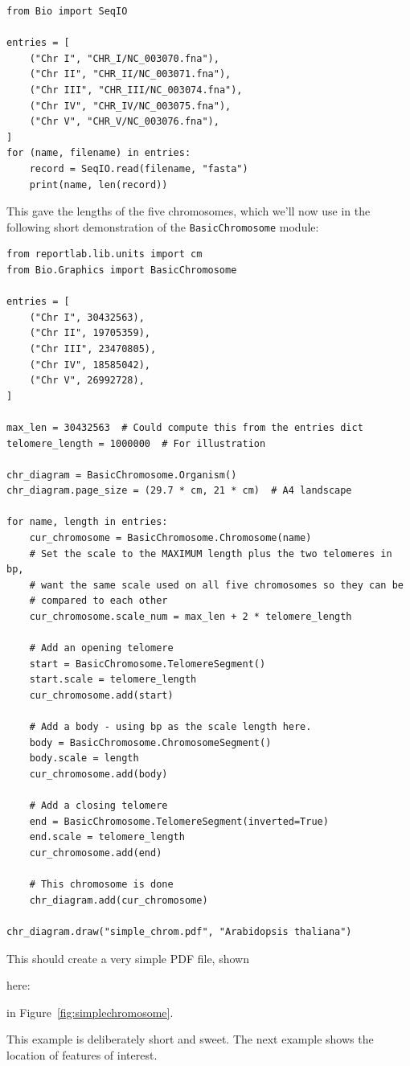 \begin{verbatim}
from Bio import SeqIO

entries = [
    ("Chr I", "CHR_I/NC_003070.fna"),
    ("Chr II", "CHR_II/NC_003071.fna"),
    ("Chr III", "CHR_III/NC_003074.fna"),
    ("Chr IV", "CHR_IV/NC_003075.fna"),
    ("Chr V", "CHR_V/NC_003076.fna"),
]
for (name, filename) in entries:
    record = SeqIO.read(filename, "fasta")
    print(name, len(record))
\end{verbatim}

\noindent This gave the lengths of the five chromosomes, which we'll now use in
the following short demonstration of the \verb|BasicChromosome| module:

\begin{verbatim}
from reportlab.lib.units import cm
from Bio.Graphics import BasicChromosome

entries = [
    ("Chr I", 30432563),
    ("Chr II", 19705359),
    ("Chr III", 23470805),
    ("Chr IV", 18585042),
    ("Chr V", 26992728),
]

max_len = 30432563  # Could compute this from the entries dict
telomere_length = 1000000  # For illustration

chr_diagram = BasicChromosome.Organism()
chr_diagram.page_size = (29.7 * cm, 21 * cm)  # A4 landscape

for name, length in entries:
    cur_chromosome = BasicChromosome.Chromosome(name)
    # Set the scale to the MAXIMUM length plus the two telomeres in bp,
    # want the same scale used on all five chromosomes so they can be
    # compared to each other
    cur_chromosome.scale_num = max_len + 2 * telomere_length

    # Add an opening telomere
    start = BasicChromosome.TelomereSegment()
    start.scale = telomere_length
    cur_chromosome.add(start)

    # Add a body - using bp as the scale length here.
    body = BasicChromosome.ChromosomeSegment()
    body.scale = length
    cur_chromosome.add(body)

    # Add a closing telomere
    end = BasicChromosome.TelomereSegment(inverted=True)
    end.scale = telomere_length
    cur_chromosome.add(end)

    # This chromosome is done
    chr_diagram.add(cur_chromosome)

chr_diagram.draw("simple_chrom.pdf", "Arabidopsis thaliana")
\end{verbatim}

This should create a very simple PDF file, shown
\begin{htmlonly}
here:


\end{htmlonly}
\begin{latexonly}
in Figure~\ref{fig:simplechromosome}.
\end{latexonly}
This example is deliberately short and sweet. The next example shows the
location of features of interest.

